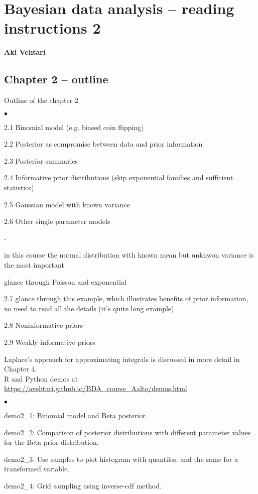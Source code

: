 \documentclass[a4paper,11pt,english]{article}
\begin{document}
\thispagestyle{empty}

\section*{Bayesian data analysis -- reading instructions 2} 
\smallskip
{\bf Aki Vehtari}
\smallskip

\subsection*{Chapter 2 -- outline}

Outline of the chapter 2
\begin{list}{$\bullet$}{\parsep=0pt\itemsep=2pt}
\item 2.1 Binomial model (e.g. biased coin flipping)
\item 2.2 Posterior as compromise between data and prior information
\item 2.3 Posterior summaries
\item 2.4 Informative prior distributions (skip exponential families and sufficient statistics)
\item 2.5 Gaussian model with known variance
\item 2.6 Other single parameter models
  \begin{list}{-}{\parsep=0pt\itemsep=2pt}
  \item in this course the normal distribution with known mean but
    unknwon variance is the most important
  \item glance through Poisson and exponential
  \end{list}
\item 2.7 glance through this example, which illustrates benefits of prior information, no need to read all the details (it's quite long example)
\item 2.8 Noninformative priors
\item 2.9 Weakly informative priors
\end{list}

Laplace's approach for approximating integrals is discussed in more
detail in Chapter 4.\\


R and Python demos at \url{https://avehtari.github.io/BDA_course_Aalto/demos.html}
\begin{list}{$\bullet$}{\parsep=0pt\itemsep=2pt}
\item demo2\_1: Binomial model and Beta posterior.
\item demo2\_2: Comparison of posterior distributions with different
parameter values for the Beta prior distribution.
\item demo2\_3: Use samples to plot histogram with quantiles, and
  the same for a transformed variable.
\item demo2\_4: Grid sampling using inverse-cdf method.
\end{list}
\end{document}
